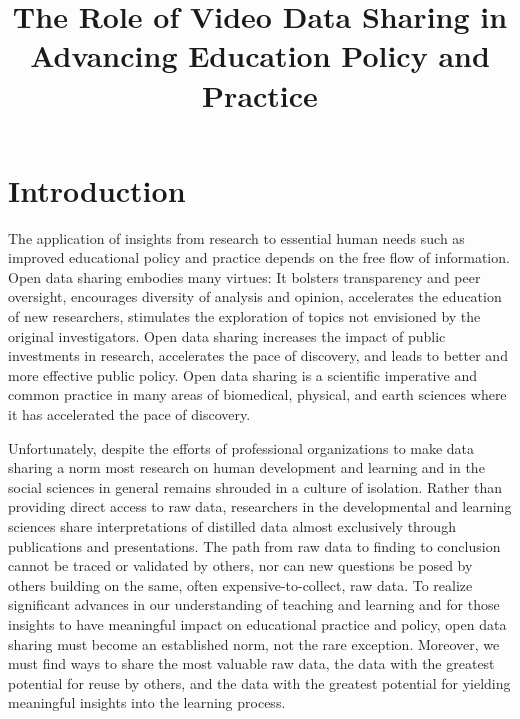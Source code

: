\documentclass[letterpaper,man,apacite]{apa6}
\title{The Role of Video Data Sharing in Advancing Education Policy and Practice}
\begin{document}
\maketitle

\section{Introduction}

The application of insights from research to essential human needs such as improved educational policy and practice depends on the free flow of information. 
Open data sharing embodies many virtues: It bolsters transparency and peer oversight, encourages diversity of analysis and opinion, accelerates the education of new researchers, stimulates the exploration of topics not envisioned by the original investigators.
Open data sharing increases the impact of public investments in research, accelerates the pace of discovery, and leads to better and more effective public policy.
Open data sharing is a scientific imperative and common practice in many areas of biomedical, physical, and earth sciences where it has accelerated the pace of discovery.

Unfortunately, despite the efforts of professional organizations to make data sharing a norm \cite{AERA-Code-2011} most research on human development and learning \cite{Adolph2012} and in the social sciences in general \cite{Nosek2012} remains shrouded in a culture of isolation. 
Rather than providing direct access to raw data, researchers in the developmental and learning sciences share interpretations of distilled data almost exclusively through publications and presentations.
The path from raw data to finding to conclusion cannot be traced or validated by others, nor can new questions be posed by others building on the same, often expensive-to-collect, raw data.
To realize significant advances in our understanding of teaching and learning and for those insights to have meaningful impact on educational practice and policy, open data sharing must become an established norm, not the rare exception.
Moreover, we must find ways to share the most valuable raw data, the data with the greatest potential for reuse by others, and the data with the greatest potential for yielding meaningful insights into the learning process.
\end{document}
